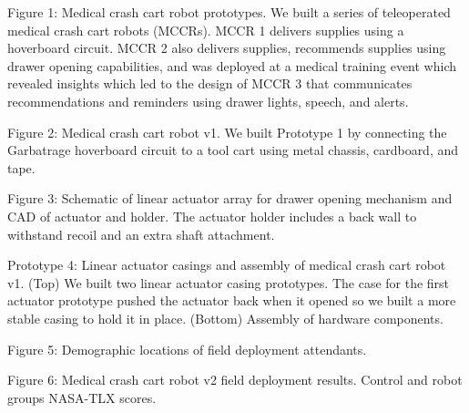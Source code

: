 Figure 1: Medical crash cart robot prototypes. We built a series of teleoperated medical crash cart robots (MCCRs). MCCR 1 delivers supplies using a hoverboard circuit. MCCR 2 also delivers supplies, recommends supplies using drawer opening capabilities, and was deployed at a medical training event which revealed insights which led to the design of MCCR 3 that communicates recommendations and reminders using drawer lights, speech, and alerts.


Figure 2: Medical crash cart robot v1. We built Prototype 1 by connecting the Garbatrage hoverboard circuit to a tool cart using metal chassis, cardboard, and tape.

Figure 3: Schematic of linear actuator array for drawer opening mechanism and CAD of actuator and holder. The actuator holder includes a back wall to withstand recoil and an extra shaft attachment.

Prototype 4: Linear actuator casings and assembly of medical crash cart robot v1. (Top) We built two linear actuator casing prototypes. The case for the first actuator prototype pushed the actuator back when it opened so we built a more stable casing to hold it in place. (Bottom) Assembly of hardware components.

Figure 5: Demographic locations of field deployment attendants.

Figure 6: Medical crash cart robot v2 field deployment results. Control and robot groups NASA-TLX  scores.